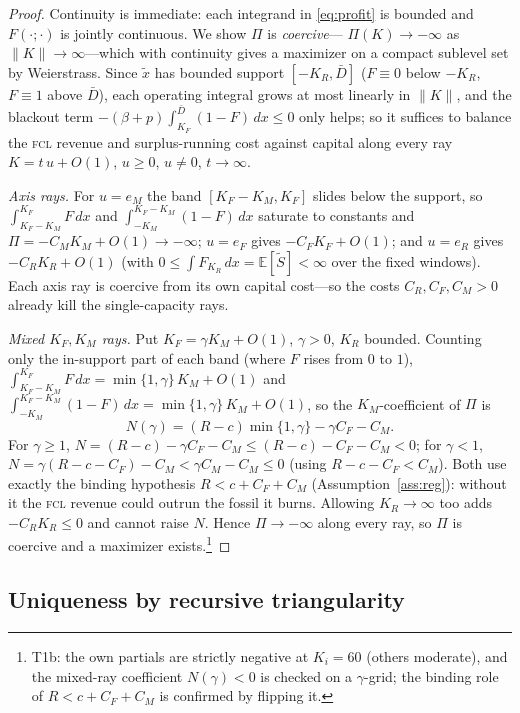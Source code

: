 \documentclass[11pt,reqno]{amsart}
\theoremstyle{plain}
\theoremstyle{definition}
\theoremstyle{remark}
\newcommand{\KR}{K_R}
\newcommand{\KF}{K_F}
\newcommand{\KM}{K_M}
\newcommand{\Dbar}{\bar D}
\newcommand{\CM}{C_M}
\newcommand{\CF}{C_F}
\newcommand{\CR}{C_R}
\newcommand{\bp}{\beta+p}
\newcommand{\FKR}{F_{\!\KR}}
\newcommand{\E}{\mathbb{E}}
\begin{document}
\begin{proof}
Continuity is immediate: each integrand in \eqref{eq:profit} is bounded and
$F(\cdot;\cdot)$ is jointly continuous. We show $\Pi$ is \emph{coercive}---
$\Pi(K)\to-\infty$ as $\|K\|\to\infty$---which with continuity gives a maximizer on
a compact sublevel set by Weierstrass. Since $\tilde x$ has bounded support
$[-\KR,\Dbar]$ ($F\equiv0$ below $-\KR$, $F\equiv1$ above $\Dbar$), each operating
integral grows at most linearly in $\|K\|$, and the blackout term
$-(\bp)\int_{\KF}^{\Dbar}(1-F)\,dx\le0$ only helps; so it suffices to balance the
\textsc{fcl} revenue and surplus-running cost against capital along every ray
$K=t\,u+O(1)$, $u\ge0$, $u\neq0$, $t\to\infty$.

\emph{Axis rays.} For $u=e_M$ the band $[\KF-\KM,\KF]$ slides below the support, so
$\int_{\KF-\KM}^{\KF}F\,dx$ and $\int_{-\KM}^{\KF-\KM}(1-F)\,dx$ saturate to
constants and $\Pi=-\CM\KM+O(1)\to-\infty$; $u=e_F$ gives $-\CF\KF+O(1)$; and
$u=e_R$ gives $-\CR\KR+O(1)$ (with $0\le\int\FKR\,dx=\E[\tilde S]<\infty$ over the
fixed windows). Each axis ray is coercive from its own capital cost---so the costs
$\CR,\CF,\CM>0$ already kill the single-capacity rays.

\emph{Mixed $\KF,\KM$ rays.} Put $\KF=\gamma\KM+O(1)$, $\gamma>0$, $\KR$ bounded.
Counting only the in-support part of each band (where $F$ rises from $0$ to $1$),
$\int_{\KF-\KM}^{\KF}F\,dx=\min\{1,\gamma\}\,\KM+O(1)$ and
$\int_{-\KM}^{\KF-\KM}(1-F)\,dx=\min\{1,\gamma\}\,\KM+O(1)$, so the
$\KM$-coefficient of $\Pi$ is
\[
  N(\gamma)=(R-c)\min\{1,\gamma\}-\gamma\CF-\CM .
\]
For $\gamma\ge1$, $N=(R-c)-\gamma\CF-\CM\le(R-c)-\CF-\CM<0$; for $\gamma<1$,
$N=\gamma(R-c-\CF)-\CM<\gamma\CM-\CM\le0$ (using $R-c-\CF<\CM$). Both use exactly
the binding hypothesis $R<c+\CF+\CM$ (Assumption~\ref{ass:reg}): without it the
\textsc{fcl} revenue could outrun the fossil it burns. Allowing $\KR\to\infty$ too
adds $-\CR\KR\le0$ and cannot raise $N$. Hence $\Pi\to-\infty$ along every ray, so
$\Pi$ is coercive and a maximizer exists.\footnote{T1b: the own partials are
strictly negative at $K_i=60$ (others moderate), and the mixed-ray coefficient
$N(\gamma)<0$ is checked on a $\gamma$-grid; the binding role of $R<c+\CF+\CM$ is
confirmed by flipping it.}
\end{proof}

\subsection{Uniqueness by recursive triangularity}
\end{document}

